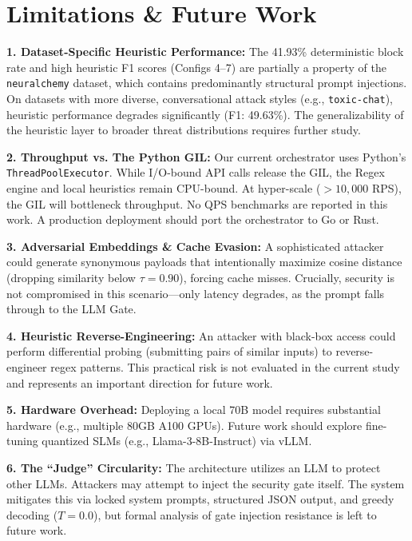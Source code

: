 \documentclass[conference]{IEEEtran}
\begin{document}
\section{Limitations \& Future Work}
\label{sec:limitations}

\textbf{1. Dataset-Specific Heuristic Performance:} The 41.93\% deterministic block rate and high heuristic F1 scores (Configs 4--7) are partially a property of the \texttt{neuralchemy} dataset, which contains predominantly structural prompt injections. On datasets with more diverse, conversational attack styles (e.g., \texttt{toxic-chat}), heuristic performance degrades significantly (F1: 49.63\%). The generalizability of the heuristic layer to broader threat distributions requires further study.

\textbf{2. Throughput vs. The Python GIL:} Our current orchestrator uses Python's \texttt{ThreadPoolExecutor}. While I/O-bound API calls release the GIL, the Regex engine and local heuristics remain CPU-bound. At hyper-scale ($>10{,}000$ RPS), the GIL will bottleneck throughput. No QPS benchmarks are reported in this work. A production deployment should port the orchestrator to Go or Rust.

\textbf{3. Adversarial Embeddings \& Cache Evasion:} A sophisticated attacker could generate synonymous payloads that intentionally maximize cosine distance (dropping similarity below $\tau=0.90$), forcing cache misses. Crucially, security is not compromised in this scenario---only latency degrades, as the prompt falls through to the LLM Gate.

\textbf{4. Heuristic Reverse-Engineering:} An attacker with black-box access could perform differential probing (submitting pairs of similar inputs) to reverse-engineer regex patterns. This practical risk is not evaluated in the current study and represents an important direction for future work.

\textbf{5. Hardware Overhead:} Deploying a local 70B model requires substantial hardware (e.g., multiple 80GB A100 GPUs). Future work should explore fine-tuning quantized SLMs (e.g., Llama-3-8B-Instruct) via vLLM.

\textbf{6. The ``Judge'' Circularity:} The architecture utilizes an LLM to protect other LLMs. Attackers may attempt to inject the security gate itself. The system mitigates this via locked system prompts, structured JSON output, and greedy decoding ($T{=}0.0$), but formal analysis of gate injection resistance is left to future work.
\end{document}
